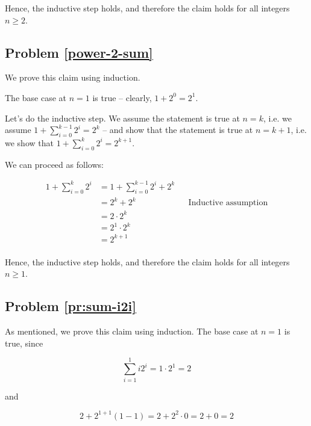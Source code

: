 Hence, the inductive step holds, and therefore the claim holds for all integers $n \geq 2$. 



\subsection{Problem \ref{power-2-sum}}

We prove this claim using induction. 

The base case at $n = 1$ is true -- clearly, $1 + 2^0 = 2^1$. 

Let's do the inductive step. We assume the statement is true at $n = k$, i.e. we assume $1 + \sum_{i=0}^{k-1} 2^i = 2^k$ -- and show that the statement is true at $n = k + 1$, i.e. we show that $1 + \sum_{i=0}^{k} 2^i = 2^{k+1}$.

We can proceed as follows: 


\begin{align*}
1 + \sum_{i=0}^{k} 2^i &= 1 + \sum_{i=0}^{k-1} 2^i + 2^k \\
&= 2^k + 2^k && \text{Inductive assumption} \\
&= 2 \cdot 2^k \\
&= 2^1 \cdot 2^k \\
&= 2^{k+1} \\
\end{align*}

Hence, the inductive step holds, and therefore the claim holds for all integers $n \geq 1$. 

\subsection{Problem \ref{pr:sum-i2i}}

As mentioned, we prove this claim using induction. The base case at $n=1$ is true, since

\begin{equation*}
\sum_{i=1}^{1} i2^i = 1 \cdot 2^1 = 2
\end{equation*}

and

\begin{equation*}
2+2^{1+1}(1-1) = 2 + 2^2 \cdot 0 = 2 + 0 = 2
\end{equation*}

